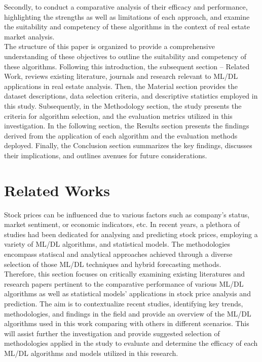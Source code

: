 \documentclass[conference]{IEEEtran}
\begin{document}
Secondly, to conduct a comparative analysis of their efficacy and performance, highlighting the strengths as well as limitations of each approach, and examine the suitability and competency of these algorithms in the context of real estate market analysis. \\
The structure of this paper is organized to provide a comprehensive understanding of these objectives to outline the suitability and competency of these algorithms. Following this introduction, the subsequent section – Related Work, reviews existing literature, journals and research relevant to ML/DL applications in real estate analysis. Then, the Material section provides the dataset descriptions, data selection criteria, and descriptive statistics employed in this study. Subsequently, in the Methodology section, the study presents the criteria for algorithm selection, and the evaluation metrics utilized in this investigation. In the following section, the Results section presents the findings derived from the application of each algorithm and the evaluation methods deployed. Finally, the Conclusion section summarizes the key findings, discusses their implications, and outlines avenues for future considerations. 

\section{\textbf{Related Works}}

Stock prices can be influenced due to various factors such as company’s status, market sentiment, or economic indicators, etc. In recent years, a plethora of studies had been dedicated for analysing and predicting stock prices, employing a variety of ML/DL algorithms, and statistical models. The methodologies encompass statiscal and analytical approaches achieved through a diverse selection of those ML/DL techniques and hybrid forecasting methods.\\ 
Therefore, this section focuses on critically examining existing literatures and research papers pertinent to the comparative performance of various ML/DL algorithms as well as statistical models’ applications in stock price analysis and prediction. The aim is to contextualize recent studies, identifying key trends, methodologies, and findings in the field and provide an overview of the ML/DL algorithms used in this work comparing with others in different scenarios. This will assist further the investigation and provide suggested selection of methodologies applied in the study to evaluate and determine the efficacy of each ML/DL algorithms and models utilized in this research.\\
\end{document}

